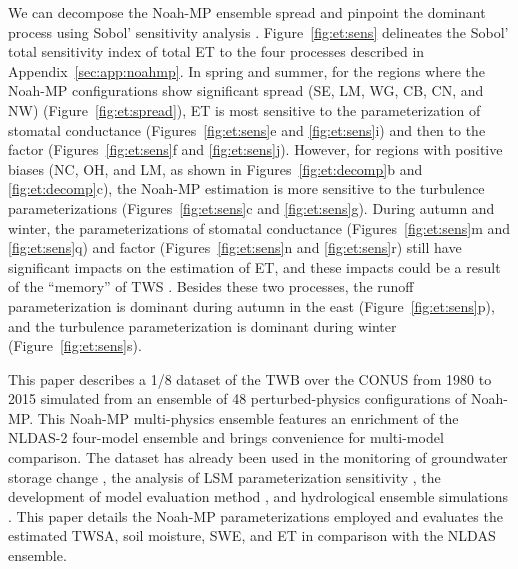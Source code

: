 \documentclass[essd, manuscript]{copernicus}
\begin{document}
We can decompose the Noah-MP ensemble spread and pinpoint the dominant process using Sobol' sensitivity analysis \citep{zheng2019WRR}. Figure~\ref{fig:et:sens} delineates the Sobol' total sensitivity index of total ET to the four processes described in Appendix~\ref{sec:app:noahmp}. In spring and summer, for the regions where the Noah-MP configurations show significant spread (SE, LM, WG, CB, CN, and NW) (Figure~\ref{fig:et:spread}), ET is most sensitive to the parameterization of stomatal conductance (Figures~\ref{fig:et:sens}e and \ref{fig:et:sens}i) and then to the \beta{} factor (Figures~\ref{fig:et:sens}f and \ref{fig:et:sens}j). However, for regions with positive biases (NC, OH, and LM, as shown in Figures~\ref{fig:et:decomp}b and \ref{fig:et:decomp}c), the Noah-MP estimation is more sensitive to the turbulence parameterizations (Figures~\ref{fig:et:sens}c and \ref{fig:et:sens}g). During autumn and winter, the parameterizations of stomatal conductance (Figures~\ref{fig:et:sens}m and \ref{fig:et:sens}q) and \beta{} factor (Figures~\ref{fig:et:sens}n and \ref{fig:et:sens}r) still have significant impacts on the estimation of ET, and these impacts could be a result of the ``memory'' of TWS \citep{zheng2019WRR}. Besides these two processes, the runoff parameterization is dominant during autumn in the east (Figure~\ref{fig:et:sens}p), and the turbulence parameterization is dominant during winter (Figure~\ref{fig:et:sens}s).

\label{sec:availability}

\conclusions{}\label{sec:conclusions}

This paper describes a 1/8\degree{} dataset of the TWB over the CONUS from 1980 to 2015 simulated from an ensemble of 48 perturbed-physics configurations of Noah-MP\@. This Noah-MP multi-physics ensemble features an enrichment of the NLDAS-2 four-model ensemble and brings convenience for multi-model comparison. The dataset has already been used in the monitoring of groundwater storage change \citep{rateb2020WRR}, the analysis of LSM parameterization sensitivity \citep{zheng2019WRR}, the development of model evaluation method \citep{zheng2020JAMES}, and hydrological ensemble simulations \citep{fei2021WRR}. This paper details the Noah-MP parameterizations employed and evaluates the estimated TWSA, soil moisture, SWE, and ET in comparison with the NLDAS ensemble.
\end{document}
